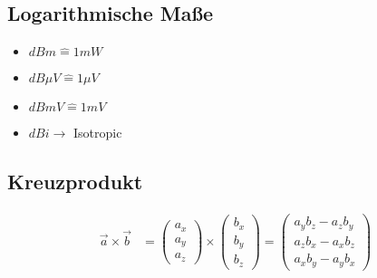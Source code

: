 \subsection{Logarithmische Maße}

{\samepage
    \begin{itemize}
        \setlength\itemsep{0pt}
        \item $\si{dBm} \hat=  1\si{mW}$
        \item $\si{dB\mu} V \hat= 1\si{\mu V}$
        \item $\si{dBmV} \hat{=} 1mV$
        \item $\si{dBi} \rightarrow$ Isotropic
    \end{itemize}
}
\subsection{Kreuzprodukt}
\begin{align*}
    \vec{a}\times\vec{b} & =
    \begin{pmatrix}
        a_x \\
        a_y \\
        a_z
    \end{pmatrix}
    \times
    \begin{pmatrix}
        b_x \\
        b_y \\
        b_z
    \end{pmatrix} =
    \begin{pmatrix}
        a_yb_z-a_zb_y \\
        a_zb_x-a_xb_z \\
        a_xb_y-a_yb_x
    \end{pmatrix}
\end{align*}

